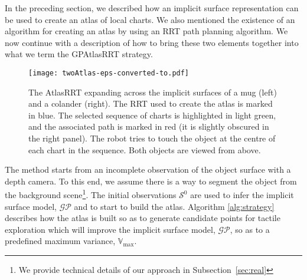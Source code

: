 In the preceding section, we described how an implicit surface representation can be used to create an atlas of local charts. We also mentioned the existence of an algorithm for creating an atlas by using an RRT path planning algorithm. We now continue with a description of how to bring these two elements together into what we term the GPAtlasRRT strategy. 

\begin{figure*}[t]
    \centering
    \texttt{[image: twoAtlas-eps-converted-to.pdf]}
    \caption{The AtlasRRT expanding across the implicit surfaces of a mug (left) and a colander (right). The RRT used to create the atlas is marked in blue. The selected sequence of charts is highlighted in light green, and the associated path is marked in red (it is slightly obscured in the right panel). The robot tries to touch the object at the centre of each chart in the sequence. Both objects are viewed from above.}
    \label{fig:GPAtlasRRTtwo}
\end{figure*}

The method starts from an incomplete observation of the object surface with a depth camera. To this end, we assume there is a way to segment the object from the background scene\footnote{We provide technical details of our approach in Subsection~\ref{sec:real}}. 
The initial observations $\mathcal{S}^0$ are used to infer the implicit surface model, $\mathcal{GP}$ and to start to build the atlas. Algorithm \ref{alg:strategy} describes how the atlas is built so as to generate candidate points for tactile exploration which will improve the implicit surface model, $\mathcal{GP}$, so as to a predefined maximum variance, $\mathbb{V}_{\max}$. 

